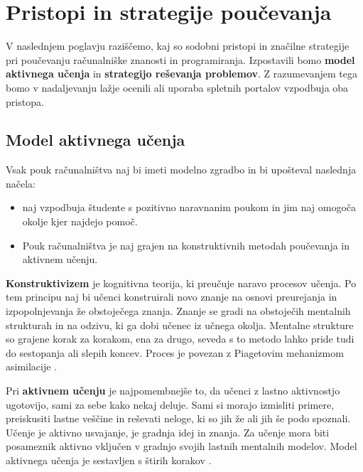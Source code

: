 \section{Pristopi in strategije poučevanja}
\label{sec:aktivno_resevanje_prob}

V naslednjem poglavju raziščemo, kaj so sodobni pristopi in značilne
strategije pri poučevanju računalniške znanosti in
programiranja. Izpostavili bomo \textbf{model aktivnega učenja} in
\textbf{strategijo reševanja problemov}. Z razumevanjem tega bomo v
nadaljevanju lažje ocenili ali uporaba spletnih portalov vzpodbuja oba
pristopa.

\subsection{Model aktivnega učenja}
\label{sec:model-aktivn-uenja}

Vsak pouk računalništva naj bi imeti modelno zgradbo in bi upošteval
naslednja načela:
\begin{itemize}
\tightlist
\item naj vzpodbuja študente s pozitivno naravnanim poukom in jim naj
  omogoča okolje kjer najdejo pomoč.
\item Pouk računalništva je naj grajen na konstruktivnih metodah
  poučevanja in aktivnem učenju.
\end{itemize}

\textbf{Konstruktivizem} je kognitivna teorija, ki preučuje naravo
procesov učenja. Po tem principu naj bi učenci konstruirali novo
znanje na osnovi preurejanja in izpopolnjevanja že obstoječega
znanja. Znanje se gradi na obstoječih mentalnih strukturah in na
odzivu, ki ga dobi učenec iz učnega okolja. Mentalne strukture so
grajene korak za korakom, ena za drugo, seveda s to metodo lahko pride
tudi do sestopanja ali slepih koncev. Proces je povezan z Piagetovim
mehanizmom asimilacije \cite{guideTCS}.

Pri \textbf{aktivnem učenju} je najpomembnejše to, da učenci z lastno
aktivnostjo ugotovijo, sami za sebe kako nekaj deluje. Sami si morajo
izmisliti primere, preiskusiti lastne veščine in reševati neloge, ki
so jih že ali jih še podo spoznali. Učenje je aktivno usvajanje, je
gradnja idej in znanja. Za učenje mora biti posameznik aktivno
vključen v gradnjo svojih lastnih mentalnih modelov.  Model aktivnega
učenja je sestavljen s štirih korakov \cite{guideTCS}.

